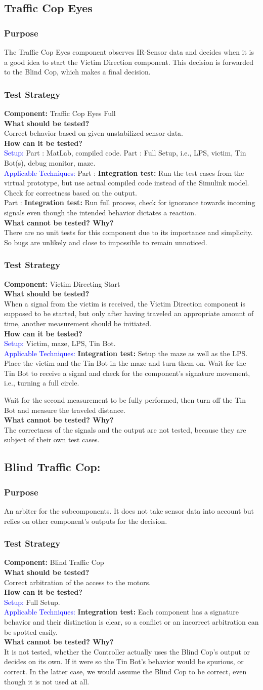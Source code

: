 \documentclass[a4paper,parskip,headheight=38pt]{scrartcl} %
\newcommand*{\rom}[1]{\uppercase\expandafter{\romannumeral #1\relax}}
\newcommand{\teststrat}[5]{
    \subsubsection{Test Strategy}
	\textbf{Component:} #1 \\
	\noindent\textbf{What should be tested?} \\
    \noindent #2 \\
	\noindent\textbf{How can it be tested?} \\
    \noindent\textcolor{blue}{Setup:} #3 \\
    \noindent\textcolor{blue}{Applicable Techniques:} #4 \\
	\noindent\textbf{What cannot be tested? Why?} \\
    \noindent #5
}
\newcommand{\ie}{i.e.}
\newcommand{\BLACK}{\textbf{Integration test: }}
\begin{document}
\subsection{Traffic Cop Eyes}
\subsubsection{Purpose}
The Traffic Cop Eyes component observes IR-Sensor data and decides when it is a
good idea to start the Victim Direction component. This decision is forwarded to
the Blind Cop, which makes a final decision.
\teststrat{Traffic Cop Eyes Full}{
    Correct behavior based on given unstabilized sensor data. 
}{
    Part \rom{1}: MatLab, compiled code. Part \rom{2}: Full Setup, \ie, LPS,
    victim, Tin Bot(s), debug monitor, maze.
}{
    Part \rom{1}: \BLACK Run the test cases from the virtual prototype, but use
    actual
    compiled code instead of the Simulink model. Check for correctness based
    on the output. \\
    Part \rom{2}: \BLACK Run full process, check for ignorance towards incoming
    signals
    even though the intended behavior dictates a reaction. 
}{
    There are no unit tests for this component due to its importance and
    simplicity. So bugs are unlikely and close to impossible to remain
    unnoticed.
}

\teststrat{Victim Directing Start}{
    When a signal from the victim is received, the Victim Direction component
    is supposed to be started, but only after having traveled an appropriate
    amount
    of time, another measurement should be initiated.
}{
    Victim, maze, LPS, Tin Bot.
}{
    \BLACK Setup the maze as well as the LPS. Place the victim and the
    Tin Bot in the
    maze and turn them on. Wait for the Tin Bot to receive a signal and check
    for the component's signature movement, \ie, turning a full circle.

    Wait for the second measurement to be fully performed, then turn off the Tin
    Bot and measure the traveled distance.
}{
    The correctness of the signals and the output are not tested, because they
    are subject of their own test cases.
}
%
\subsection{Blind Traffic Cop:}
\subsubsection{Purpose}
An arbiter for the subcomponents. It does not take sensor data into account but
relies on other component's outputs for the decision.
\teststrat{Blind Traffic Cop}{
    Correct arbitration of the access to the motors.
}{
    Full Setup.
}{
    \BLACK Each component has a signature behavior and
    their distinction is clear, so a conflict or an incorrect arbitration can be
    spotted easily.
}{
    It is not tested, whether the Controller actually uses the Blind Cop's
    output or decides on its own. If it were so the Tin Bot's behavior would be
    spurious, or correct. In the latter case, we would assume the Blind Cop to
    be correct, even though it is not used at all.
}
%
\end{document}
